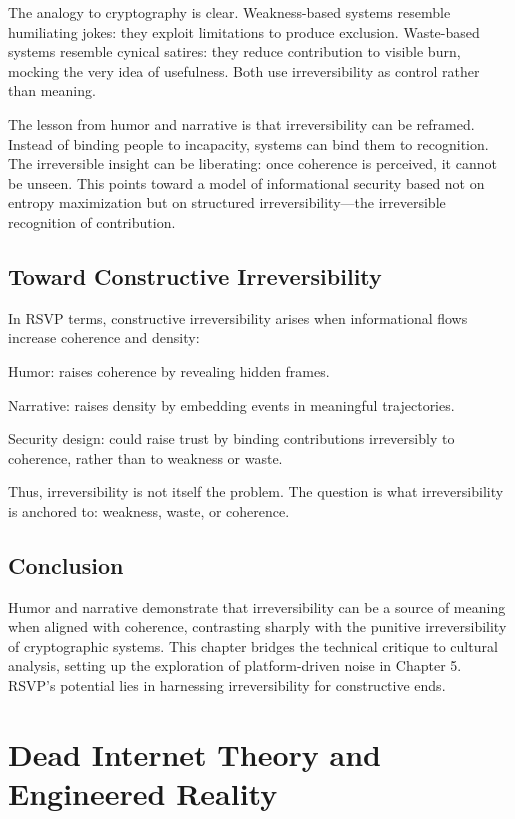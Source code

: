 \documentclass{book}
\begin{document}
The analogy to cryptography is clear. Weakness-based systems resemble humiliating jokes: they exploit limitations to produce exclusion. Waste-based systems resemble cynical satires: they reduce contribution to visible burn, mocking the very idea of usefulness. Both use irreversibility as control rather than meaning.

The lesson from humor and narrative is that irreversibility can be reframed. Instead of binding people to incapacity, systems can bind them to recognition. The irreversible insight can be liberating: once coherence is perceived, it cannot be unseen. This points toward a model of informational security based not on entropy maximization but on structured irreversibility—the irreversible recognition of contribution.

\section{Toward Constructive Irreversibility}

In RSVP terms, constructive irreversibility arises when informational flows increase coherence and density:

Humor: raises coherence by revealing hidden frames.

Narrative: raises density by embedding events in meaningful trajectories.

Security design: could raise trust by binding contributions irreversibly to coherence, rather than to weakness or waste.

Thus, irreversibility is not itself the problem. The question is what irreversibility is anchored to: weakness, waste, or coherence.

\section{Conclusion}

Humor and narrative demonstrate that irreversibility can be a source of meaning when aligned with coherence, contrasting sharply with the punitive irreversibility of cryptographic systems. This chapter bridges the technical critique to cultural analysis, setting up the exploration of platform-driven noise in Chapter 5. RSVP’s potential lies in harnessing irreversibility for constructive ends.

\chapter{Dead Internet Theory and Engineered Reality}
\end{document}
